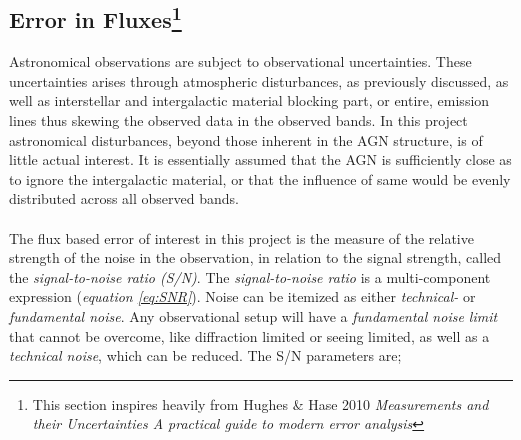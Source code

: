 \documentclass[a4paper, 12pt, twoside]{article}
\begin{document}
\subsection[Error in Fluxes]{Error in Fluxes\footnote{This section inspires heavily from Hughes \& Hase 2010 \emph{Measurements and their Uncertainties A practical guide to modern error analysis}\cite{Hughes2010}}} \label{error}
Astronomical observations are subject to observational uncertainties. These uncertainties arises through atmospheric disturbances, as previously discussed, as well as interstellar and intergalactic material blocking part, or entire, emission lines thus skewing the observed data in the observed bands. In this project astronomical disturbances, beyond those inherent in the AGN structure, is of little actual interest. It is essentially assumed that the AGN is sufficiently close as to ignore the intergalactic material, or that the influence of same would be evenly distributed across all observed bands. \\
\\
The flux based error of interest in this project is the measure of the relative strength of the noise in the observation, in relation to the signal strength, called the \emph{signal-to-noise ratio (S/N)}. The \emph{signal-to-noise ratio} is a multi-component expression (\emph{equation \ref{eq:SNR}}). Noise can be itemized as either \emph{technical-} or \emph{fundamental noise}. Any observational setup will have a \emph{fundamental noise limit} that cannot be overcome, like diffraction limited or seeing limited, as well as a \emph{technical noise}, which can be reduced. The S/N parameters are\cite{SNR};
\end{document}
